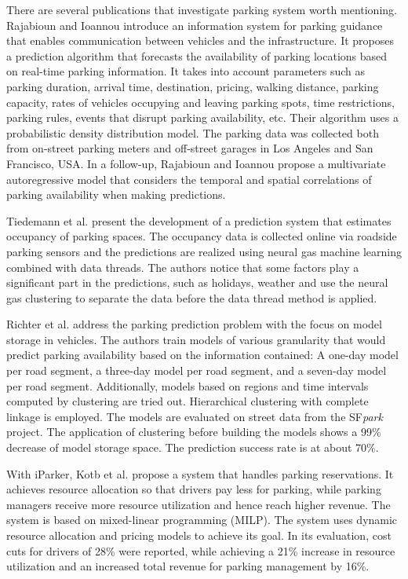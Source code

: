 	There are several publications that investigate parking system worth mentioning. Rajabioun and Ioannou\cite{rajabioun2013} introduce an information system for parking guidance that enables communication between vehicles and the infrastructure. It proposes a prediction algorithm that forecasts the availability of parking locations based on real-time parking information. It takes into account parameters such as parking duration, arrival time, destination, pricing, walking distance, parking capacity, rates of vehicles occupying and leaving parking spots, time restrictions, parking rules, events that disrupt parking availability, etc. Their algorithm uses a probabilistic density distribution model. The parking data was collected both from on-street parking meters and off-street garages in Los Angeles and San Francisco, USA. In a follow-up, Rajabioun and Ioannou\cite{rajabioun2015} propose a multivariate autoregressive model that considers the temporal and spatial correlations of parking availability when making predictions. 
	
	Tiedemann et al.\cite{tiedemann} present the development of a prediction system that estimates occupancy of parking spaces. The occupancy data is collected online via roadside parking sensors and the predictions are realized using
	 neural gas machine learning combined with data threads. The authors notice that some factors play a significant part in the predictions, such as holidays, weather and use the neural gas clustering to separate the data before the data thread method is applied. 
	
	Richter et al.\cite{richter} address the parking prediction problem with the focus on model storage in vehicles. The authors train models of various granularity that would predict parking availability based on the information contained: A one-day model per road segment, a three-day model per road segment, and a seven-day model per road segment. Additionally, models based on regions and time intervals computed by clustering are tried out. Hierarchical clustering with complete linkage is employed. The models are evaluated on street data from the SF\textit{park} project\cite{sfpark_open_data}. The application of clustering before building the models shows a 99\% decrease of model storage space. The prediction success rate is at about 70\%. 
	
	With iParker, Kotb et al.\cite{kotb} propose a system that handles parking reservations. It achieves resource allocation so that drivers pay less for parking, while parking managers receive more resource utilization and hence reach higher revenue. The system is based on mixed-linear programming (MILP). The system uses dynamic resource allocation and pricing models to achieve its goal. In its evaluation, cost cuts for drivers of 28\% were reported, while achieving a 21\% increase in resource utilization and an increased total revenue for parking management by 16\%. 
	
